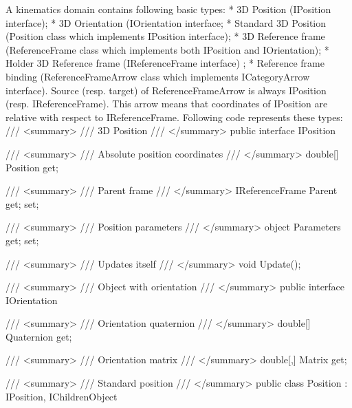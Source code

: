 \documentclass[10pt,journal,compsoc]{IEEEtran}
\begin{document}
A {kinematics} domain contains following basic types:
* 3D Position (IPosition interface);  
* 3D Orientation (IOrientation interface; 
* Standard 3D Position (Position class which implements IPosition interface);  
* 3D Reference frame (ReferenceFrame class which implements both IPosition and IOrientation);  
* Holder 3D Reference frame (IReferenceFrame interface) ; 
* Reference frame binding (ReferenceFrameArrow class which implements ICategoryArrow interface). 
Source (resp. target) of ReferenceFrameArrow is always IPosition (resp. IReferenceFrame). This arrow means that coordinates of IPosition are relative with respect to IReferenceFrame. Following code represents these types:
/// <summary>
/// 3D Position
/// </summary>
public interface IPosition
{
	
	/// <summary>
	/// Absolute position coordinates
	/// </summary>
	double[] Position
	{
		get;
	}
	
	/// <summary>
	/// Parent frame
	/// </summary>
	IReferenceFrame Parent
	{
		get;
		set;
	}
	
	/// <summary>
	/// Position parameters
	/// </summary>
	object Parameters
	{
		get;
		set;
	}
	
	/// <summary>
	/// Updates itself
	/// </summary>
	void Update();
}
/// <summary>
/// Object with orientation
/// </summary>
public interface IOrientation
{
	/// <summary>
	/// Orientation quaternion
	/// </summary>
	double[] Quaternion
	{
		get;
	}
	
	/// <summary>
	/// Orientation matrix
	/// </summary>
	double[,] Matrix
	{
		get;
	}
}
/// <summary>
/// Standard position
/// </summary>
public class Position : IPosition, IChildrenObject
\end{document}
